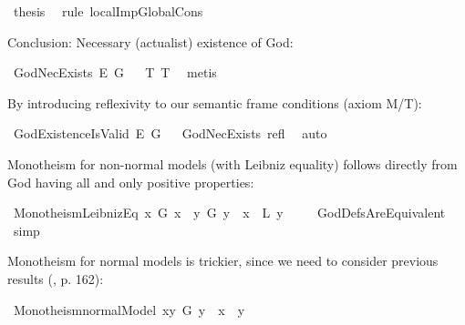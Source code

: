 \begin{isabellebody}
\ {\isacharquery}thesis\ \isamarkupfalse%
\ {\isacharparenleft}rule\ localImpGlobalCons{\isacharparenright}\isanewline
{}\isamarkupfalse%
%
%
%
%
\begin{isamarkuptext}%
Conclusion: Necessary (actualist) existence of God:%
\end{isamarkuptext}\isamarkuptrue%
\isamarkupfalse%
\ GodNecExists{\isacharcolon}\ {\isachardoublequoteopen}{\isasymlfloor}\isactrlbold {\isasymbox}\isactrlbold {\isasymexists}\isactrlsup E\ G{\isasymrfloor}{\isachardoublequoteclose}%
\ %
%
\isamarkupfalse%
\ T{}\ T{}\ \isamarkupfalse%
\ metis%
%
%
%
\begin{isamarkuptext}%
By introducing reflexivity to our semantic frame conditions (axiom M/T):%
\end{isamarkuptext}\isamarkuptrue%
\isamarkupfalse%
\ GodExistenceIsValid{\isacharcolon}\ {\isachardoublequoteopen}{\isasymlfloor}\isactrlbold {\isasymexists}\isactrlsup E\ G{\isasymrfloor}{\isachardoublequoteclose}%
\ %
%
\isamarkupfalse%
\ GodNecExists\ refl\ \isamarkupfalse%
\ auto%
%
%
%
\begin{isamarkuptext}%
Monotheism for non-normal models (with Leibniz equality) follows directly from God having all and only positive properties:%
\end{isamarkuptext}\isamarkuptrue%
\isamarkupfalse%
\ Monotheism{\isacharunderscore}LeibnizEq{\isacharcolon}\ {\isachardoublequoteopen}{\isasymlfloor}\isactrlbold {\isasymforall}x{\isachardot}\ G\ x\ \isactrlbold {\isasymrightarrow}\ {\isacharparenleft}\isactrlbold {\isasymforall}y{\isachardot}\ G\ y\ \isactrlbold {\isasymrightarrow}\ {\isacharparenleft}x\ \ \isactrlbold {\isasymapprox}\isactrlsup L\ y{\isacharparenright}{\isacharparenright}{\isasymrfloor}{\isachardoublequoteclose}\ \isanewline
%
\ \ %
%
\isamarkupfalse%
\ GodDefsAreEquivalent\ \isamarkupfalse%
\ simp%
%
%
%
\begin{isamarkuptext}%
Monotheism for normal models is trickier, since we need to consider previous results (\cite{Fitting}, p. 162):%
\end{isamarkuptext}\isamarkuptrue%
\isamarkupfalse%
\ Monotheism{\isacharunderscore}normalModel{\isacharcolon}\ {\isachardoublequoteopen}{\isasymlfloor}\isactrlbold {\isasymexists}x{\isachardot}\isactrlbold {\isasymforall}y{\isachardot}\ G\ y\ \isactrlbold {\isasymleftrightarrow}\ x\ \isactrlbold {\isasymapprox}\ y{\isasymrfloor}{\isachardoublequoteclose}\isanewline

\end{isabellebody}
